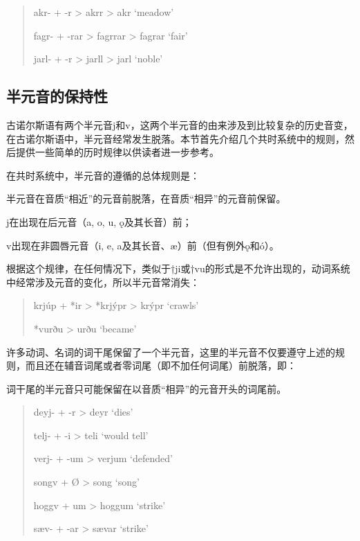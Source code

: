 \begin{quote}
  akr- + -r \textgreater{} akrr \textgreater{} akr `meadow'

  fagr- + -rar \textgreater{} fagrrar \textgreater{} fagrar `fair'

  jarl- + -r \textgreater{} jarll \textgreater{} jarl `noble'
\end{quote}

\subsection{半元音的保持性}
\label{半元音的保持性}

古诺尔斯语有两个半元音j和v，这两个半元音的由来涉及到比较复杂的历史音变，在古诺尔斯语中，半元音经常发生脱落。本节首先介绍几个共时系统中的规则，然后提供一些简单的历时规律以供读者进一步参考。

在共时系统中，半元音的遵循的总体规则是：

\begin{info}
    \noindent 半元音在音质``相近''的元音前脱落，在音质``相异''的元音前保留。
    
    \noindent j在出现在后元音（a, o, u, ǫ及其长音）前；
    
    \noindent v出现在非圆唇元音（i, e, a及其长音、æ）前（但有例外ǫ和ó）。
\end{info}

根据这个规律，在任何情况下，类似于†ji或†vu的形式是不允许出现的，动词系统中经常涉及元音的变化，所以半元音常消失：

\begin{quote}
  krjúp + *ir \textgreater{} *krjýpr \textgreater{} krýpr `crawls'

  *vurðu \textgreater{} urðu `became'
\end{quote}

许多动词、名词的词干尾保留了一个半元音，这里的半元音不仅要遵守上述的规则，而且还在辅音词尾或者零词尾（即不加任何词尾）前脱落，即：

\begin{info}
    词干尾的半元音只可能保留在以音质``相异''的元音开头的词尾前。
\end{info}

\begin{quote}
    deyj- + -r \textgreater{} deyr `dies'
  
    telj- + -i \textgreater{} teli `would tell'
  
    verj- + -um \textgreater{} verjum `defended'
  
    songv + Ø \textgreater{} song `song'
  
    hoggv + um \textgreater{} hoggum `strike'
  
    sæv- + -ar \textgreater{} sævar `strike'
  \end{quote}

